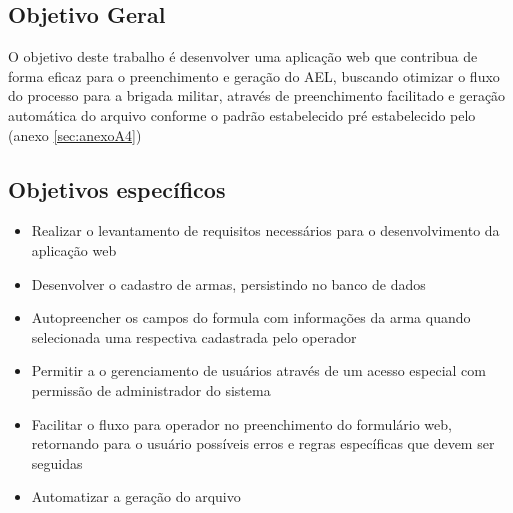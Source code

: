 \subsection{Objetivo Geral}
O objetivo deste trabalho é desenvolver uma aplicação web que contribua de forma eficaz para o preenchimento e geração do AEL, buscando otimizar o fluxo do processo para a brigada militar, através de preenchimento facilitado e geração automática do arquivo conforme o padrão estabelecido pré estabelecido pelo (anexo \ref{sec:anexoA4})

\subsection{Objetivos específicos}
\begin{itemize}
    \item Realizar o levantamento de requisitos necessários para o desenvolvimento da aplicação web 
    \item Desenvolver o cadastro de armas, persistindo no banco de dados 
    \item Autopreencher os campos do formula com informações da arma quando selecionada uma respectiva cadastrada pelo operador
    \item Permitir a o gerenciamento de usuários através de um acesso especial com permissão de administrador do sistema 
    \item Facilitar o  fluxo para operador no preenchimento do formulário web, retornando para o usuário possíveis erros e regras específicas que devem ser seguidas
    \item Automatizar a geração do arquivo
\end{itemize}  

